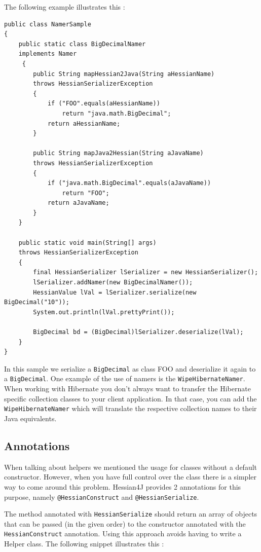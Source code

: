 \documentclass[a4paper]{article}
\begin{document}
The following example illustrates this :

\medskip
\begin{lstlisting}
public class NamerSample
{
    public static class BigDecimalNamer 
    implements Namer
     {
        public String mapHessian2Java(String aHessianName) 
        throws HessianSerializerException
        {
            if ("FOO".equals(aHessianName))
                return "java.math.BigDecimal";
            return aHessianName;
        }

        public String mapJava2Hessian(String aJavaName) 
        throws HessianSerializerException
        {
            if ("java.math.BigDecimal".equals(aJavaName))
                return "FOO";
            return aJavaName;
        }
    }

    public static void main(String[] args) 
    throws HessianSerializerException
    {
        final HessianSerializer lSerializer = new HessianSerializer();
        lSerializer.addNamer(new BigDecimalNamer());
        HessianValue lVal = lSerializer.serialize(new BigDecimal("10"));
        System.out.println(lVal.prettyPrint());

        BigDecimal bd = (BigDecimal)lSerializer.deserialize(lVal);
    }
}
\end{lstlisting}
\medskip

In this sample we serialize a \lstinline$BigDecimal$ as class FOO and deserialize it again to a \lstinline$BigDecimal$.  One example of the use of namers is the \lstinline$WipeHibernateNamer$. When working with Hibernate you don't always want to transfer the Hibernate specific collection classes to your client application. In that case, you can add the \lstinline$WipeHibernateNamer$ which will translate the respective collection names to their Java equivalents. 

\subsection{Annotations}

When talking about helpers we mentioned the usage for classes without a default constructor. However, when you have full control over the class there is a simpler way to come around this problem. Hessian4J provides 2 annotations for this purpose, namely \lstinline$@HessianConstruct$ and \lstinline$@HessianSerialize$.


The method annotated with \lstinline$HessianSerialize$ should return an array of objects that can be passed (in the given order) to the constructor annotated with the \lstinline$HessianConstruct$ annotation. Using this approach avoids having to write a Helper class. 
The following snippet illustrates this :
\end{document}
